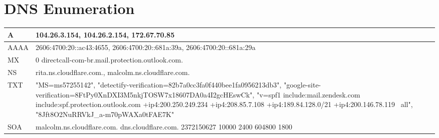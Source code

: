 
\section{DNS Enumeration}
\begin{tabularx}{\textwidth}{|l|X|}
\hline
A & 104.26.3.154, 104.26.2.154, 172.67.70.85 \\ \hline
AAAA & 2606:4700:20::ac43:4655, 2606:4700:20::681a:39a, 2606:4700:20::681a:29a \\ \hline
MX & 0 directcall-com-br.mail.protection.outlook.com. \\ \hline
NS & rita.ns.cloudflare.com., malcolm.ns.cloudflare.com. \\ \hline
TXT & "MS=ms57255142", "detectify-verification=82b7a0cc3fa0f440bee1fa0956213db3", "google-site-verification=8FtPy0XnDXI3M5nkjTOSW7x18607DA0a4I2gcHEswCk", "v=spf1 include:mail.zendesk.com include:spf.protection.outlook.com +ip4:200.250.249.234 +ip4:208.85.7.108  +ip4:189.84.128.0/21 +ip4:200.146.78.119 ~all", "8Jft8O2NuRRVkJ_a-m70pWAXa0tFAE7K" \\ \hline
SOA & malcolm.ns.cloudflare.com. dns.cloudflare.com. 2372150627 10000 2400 604800 1800 \\ \hline
\end{tabularx}
